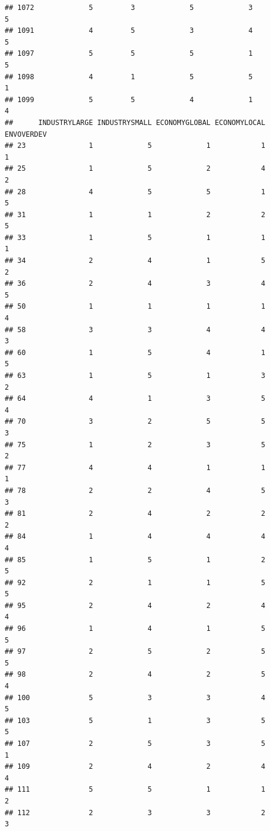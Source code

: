 \documentclass[
]{article}
\begin{document}
\begin{verbatim}
## 1072             5         3             5             3           5
## 1091             4         5             3             4           5
## 1097             5         5             5             1           5
## 1098             4         1             5             5           1
## 1099             5         5             4             1           4
##      INDUSTRYLARGE INDUSTRYSMALL ECONOMYGLOBAL ECONOMYLOCAL ENVOVERDEV
## 23               1             5             1            1          1
## 25               1             5             2            4          2
## 28               4             5             5            1          5
## 31               1             1             2            2          5
## 33               1             5             1            1          1
## 34               2             4             1            5          2
## 36               2             4             3            4          5
## 50               1             1             1            1          4
## 58               3             3             4            4          3
## 60               1             5             4            1          5
## 63               1             5             1            3          2
## 64               4             1             3            5          4
## 70               3             2             5            5          3
## 75               1             2             3            5          2
## 77               4             4             1            1          1
## 78               2             2             4            5          3
## 81               2             4             2            2          2
## 84               1             4             4            4          4
## 85               1             5             1            2          5
## 92               2             1             1            5          5
## 95               2             4             2            4          4
## 96               1             4             1            5          5
## 97               2             5             2            5          5
## 98               2             4             2            5          4
## 100              5             3             3            4          5
## 103              5             1             3            5          5
## 107              2             5             3            5          1
## 109              2             4             2            4          4
## 111              5             5             1            1          2
## 112              2             3             3            2          3

\end{verbatim}
\end{document}
